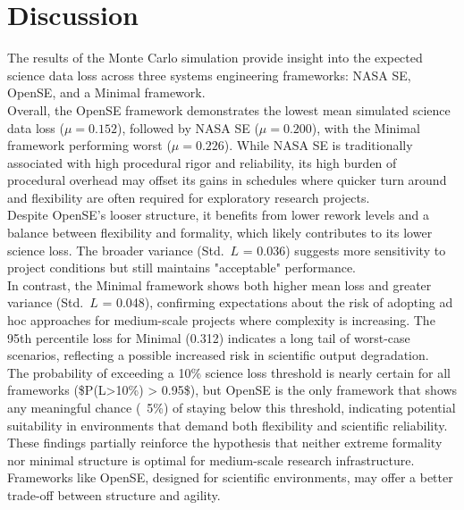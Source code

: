 \chapter{Discussion}
\label{chap:discussion}
The results of the Monte Carlo simulation provide insight into the expected science data loss across three systems engineering frameworks: NASA SE, OpenSE, and a Minimal framework.\\
Overall, the OpenSE framework demonstrates the lowest mean simulated science data loss ($\mu = 0.152$), followed by NASA SE ($\mu = 0.200$), with the Minimal framework performing worst ($\mu = 0.226$). While NASA SE is traditionally associated with high procedural rigor and reliability, its high burden of procedural overhead may offset its gains in schedules where quicker turn around and flexibility are often required for exploratory research projects.\\
Despite OpenSE’s looser structure, it benefits from lower rework levels and a balance between flexibility and formality, which likely contributes to its lower science loss. The broader variance (Std.\ $L$ = 0.036) suggests more sensitivity to project conditions but still maintains "acceptable" performance.\\
In contrast, the Minimal framework shows both higher mean loss and greater variance (Std.\ $L$ = 0.048), confirming expectations about the risk of adopting ad hoc approaches for medium-scale projects where complexity is increasing. 
The 95th percentile loss for Minimal (0.312) indicates a long tail of worst-case scenarios, reflecting a possible increased risk in scientific output degradation.\\
The probability of exceeding a 10\% science loss threshold is nearly certain for all frameworks (\$P(L>10\%) > 0.95\$), but OpenSE is the only framework that shows any meaningful chance (~5\%) of staying below this threshold, indicating potential suitability in environments that demand both flexibility and scientific reliability.\\
These findings partially reinforce the hypothesis that neither extreme formality nor minimal structure is optimal for medium-scale research infrastructure.
Frameworks like OpenSE, designed for scientific environments, may offer a better trade-off between structure and agility.